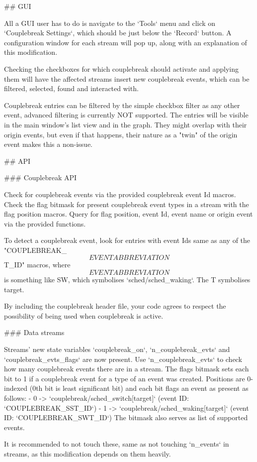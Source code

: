 \begin{code}
## GUI

All a GUI user has to do is navigate to the `Tools` menu and click on `Couplebreak Settings`, which should be just below
the `Record` button. A configuration window for each stream will pop up, along with an explanation of this modification.

Checking the checkboxes for which couplebreak should activate and applying them will have the affected streams insert new
couplebreak events, which can be filtered, selected, found and interacted with.

Couplebreak entries can be filtered by the simple checkbox filter as any other event, advanced filtering is currently
NOT supported. The entries will be visible in the main window's list view and in the graph. They might overlap with
their origin events, but even if that happens, their nature as a "twin" of the origin event makes this a non-issue.

## API

### Couplebreak API

Check for couplebreak events via the provided couplebreak event Id macros. Check the flag bitmask for present
couplebreak event types in a stream with the flag position macros. Query for flag position, event Id, event name or
origin event via the provided functions.

To detect a couplebreak event, look for entries with event Ids same as any of the "COUPLEBREAK_\[EVENT ABBREVIATION\]T_ID"
macros, where \[EVENT ABBREVIATION\] is something like SW, which symbolises `sched/sched_waking`. The T symbolises target.

By including the couplebreak header file, your code agrees to respect the possibility of being used when couplebreak is
active.

### Data streams

Streams' new state variables `couplebreak_on`, `n_couplebreak_evts` and `couplebreak_evts_flags` are now present. Use
`n_couplebreak_evts` to check how many couplebreak events there are in a stream. The flags bitmask sets each bit to 1
if a couplebreak event for a type of an event was created. Positions are 0-indexed (0th bit is least significant bit) and 
each bit flags an event as present as follows:
- 0 -> `couplebreak/sched_switch[target]` (event ID: `COUPLEBREAK_SST_ID`)
- 1 -> `couplebreak/sched_waking[target]` (event ID: `COUPLEBREAK_SWT_ID`)
The bitmask also serves as list of supported events.

It is recommended to not touch these, same as not touching `n_events` in streams, as this modification depends on them 
heavily.


\end{code}
